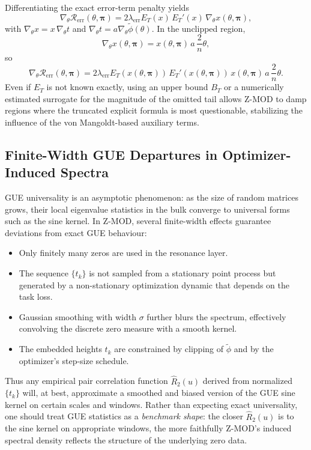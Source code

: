 \documentclass[11pt]{article}
\begin{document}
Differentiating the exact error-term penalty yields
\[
  \nabla_\theta \mathcal{R}_{\mathrm{err}}(\theta,\bm{\pi})
   = 2\lambda_{\mathrm{err}} E_T(x)\, E_T'(x)\, \nabla_\theta x(\theta,\bm{\pi}),
\]
with $\nabla_\theta x = x\,\nabla_\theta t$ and $\nabla_\theta t = a\nabla_\theta \tilde{\phi}(\theta)$. In the unclipped region,
\[
  \nabla_\theta x(\theta,\bm{\pi})
   = x(\theta,\bm{\pi})\, a\, \frac{2}{n}\theta,
\]
so
\[
  \nabla_\theta \mathcal{R}_{\mathrm{err}}(\theta,\bm{\pi})
   = 2\lambda_{\mathrm{err}} E_T(x(\theta,\bm{\pi}))\, E_T'(x(\theta,\bm{\pi}))\,
     x(\theta,\bm{\pi})\, a\, \frac{2}{n}\theta.
\]
Even if $E_T$ is not known exactly, using an upper bound $B_T$ or a numerically estimated surrogate for the magnitude of the omitted tail allows Z-MOD to damp regions where the truncated explicit formula is most questionable, stabilizing the influence of the von Mangoldt-based auxiliary terms.

\subsection{Finite-Width GUE Departures in Optimizer-Induced Spectra}

GUE universality is an asymptotic phenomenon: as the size of random matrices grows, their local eigenvalue statistics in the bulk converge to universal forms such as the sine kernel. In Z-MOD, several finite-width effects guarantee deviations from exact GUE behaviour:

\begin{itemize}
  \item Only finitely many zeros are used in the resonance layer.
  \item The sequence $\{t_k\}$ is not sampled from a stationary point process but generated by a non-stationary optimization dynamic that depends on the task loss.
  \item Gaussian smoothing with width $\sigma$ further blurs the spectrum, effectively convolving the discrete zero measure with a smooth kernel.
  \item The embedded heights $t_k$ are constrained by clipping of $\tilde{\phi}$ and by the optimizer's step-size schedule.
\end{itemize}

Thus any empirical pair correlation function $\widehat{R}_2(u)$ derived from normalized $\{t_k\}$ will, at best, approximate a smoothed and biased version of the GUE sine kernel on certain scales and windows. Rather than expecting exact universality, one should treat GUE statistics as a \emph{benchmark shape}: the closer $\widehat{R}_2(u)$ is to the sine kernel on appropriate windows, the more faithfully Z-MOD's induced spectral density reflects the structure of the underlying zero data.
\end{document}
